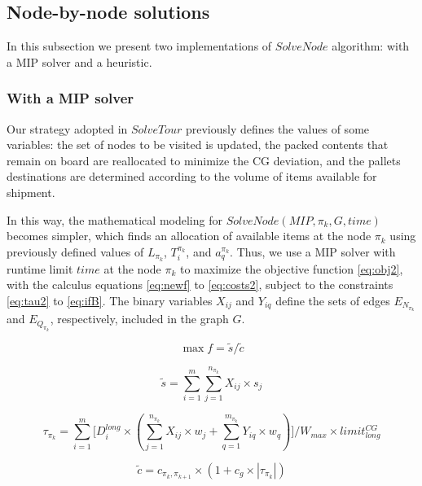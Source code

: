 \documentclass[preprint]{elsarticle}
\begin{document}
\subsection{Node-by-node solutions}
\label{methods}


In this subsection we present two implementations of $SolveNode$\/ algorithm: with a MIP solver and a heuristic.


\subsubsection{With a MIP solver}
\label{solver}

Our strategy adopted in $SolveTour$\/ previously defines the values of some variables: the set of nodes to be visited is updated, the packed contents that remain on board are reallocated to minimize the CG deviation, and the pallets destinations are determined according to the volume of items available for shipment. 

In this way, the mathematical modeling for $SolveNode(MIP,\pi_k,G, time)$\/ becomes simpler, which finds an allocation of available items at the node $\pi_k$\/ using previously defined values of $L_{\pi_k}$, $T_i^{\pi_k}$, and $a^{\pi_k}_q$. Thus, we use a MIP solver with runtime limit $time$\/ at the node $\pi_k$\/ to maximize the objective function \ref{eq:obj2}, with the calculus equations \ref{eq:newf} to \ref{eq:costs2}, subject to the constraints \ref{eq:tau2} to \ref{eq:ifB}. The binary variables $X_{ij}$\/ and $Y_{iq}$\/ define the sets of edges $E_{N_{\pi_k}}$\/ and $E_{Q_{\pi_k}}$, respectively, included in the graph $G$.

\begin{equation} \label{eq:obj2}
	\max f= \tilde{s} / \tilde{c}
\end{equation}

\begin{equation} \label{eq:newf}
	\tilde{s} = \sum_{i=1}^{m} \sum_{j=1}^{n_{\pi_k}} X_{ij} \times s_j
\end{equation}

\begin{equation} 
	\tau_{\pi_k} = \sum_{i=1}^{m} \Big [ D_i^{long} \times (\sum_{j=1}^{n_{\pi_k}} X_{ij} \times w_j +  \sum_{q=1}^{m_{\pi_k}} Y_{iq} \times w_q) \Big ] \Big / W_{max} \times limit^{CG}_{long}
\end{equation}

\begin{equation} \label{eq:costs2}
	\tilde{c} =  c_{\pi_k, \pi_{k+1}}\times(1+c_g\times|\tau_{\pi_k}|)
\end{equation}
\end{document}
